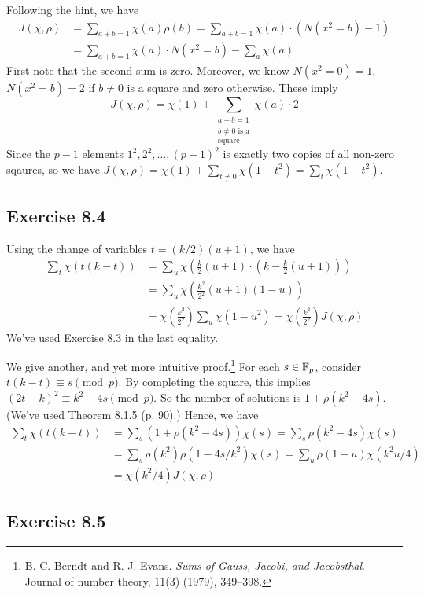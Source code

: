 \documentclass[../I&R.tex]{subfiles}
\begin{document}
Following the hint, we have
\begin{align*}
    J(\chi,\rho) &= \sum_{a+b=1} \chi(a)\rho(b)=\sum_{a+b=1} \chi(a)\cdot\left(N(x^2=b)-1\right) \\
    &= \sum_{a+b=1} \chi(a)\cdot N(x^2=b)-\sum_a \chi(a)
\end{align*}
First note that the second sum is zero. Moreover, we know $N(x^2=0)=1$, $N(x^2=b)=2$ if $b\neq0$ is a square and zero otherwise. These imply $$J(\chi,\rho) = \chi(1) + \sum_{\substack{a+b=1\\ b\neq0 \text{ is a} \\ \text{square}}} \chi(a)\cdot 2$$
Since the $p-1$ elements $1^2,2^2,\ldots,(p-1)^2$ is exactly two copies of all non-zero sqaures, so we have $J(\chi,\rho) = \chi(1) + \sum_{t\neq0} \chi(1-t^2) = \sum_t \chi(1-t^2)$.

\subsection*{Exercise 8.4}

Using the change of variables $t=(k/2)(u+1)$, we have
\begin{align*}
    \sum_t \chi(t(k-t)) &= \sum_u \chi\left(\frac{k}{2}(u+1)\cdot\left(k-\frac{k}{2}(u+1)\right)\right) \\
    &= \sum_u \chi\left(\frac{k^2}{2^2}(u+1)(1-u)\right) \\ 
    &= \chi\left(\frac{k^2}{2^2}\right)\sum_u \chi(1-u^2) = \chi\left(\frac{k^2}{2^2}\right) J(\chi,\rho)
\end{align*}
We've used Exercise 8.3 in the last equality.

We give another, and yet more intuitive proof.\footnote{B. C. Berndt and R. J. Evans. \textit{Sums of Gauss, Jacobi, and Jacobsthal}. Journal of number theory, 11(3) (1979), 349–398.} For each $s\in\mathbb{F}_p$, consider $t(k-t)\equiv s\pmod{p}$. By completing the square, this implies $(2t-k)^2\equiv k^2-4s\pmod{p}$. So the number of solutions is $1+\rho(k^2-4s)$. (We've used Theorem 8.1.5 (p. 90).) Hence, we have
\begin{align*}
    \sum_t \chi(t(k-t)) &= \sum_s \left(1+\rho(k^2-4s)\right)\chi(s) = \sum_s \rho(k^2-4s)\chi(s) \\
    &= \sum_s \rho(k^2)\rho(1-4s/k^2)\chi(s) = \sum_u \rho(1-u)\chi(k^2u/4) \\
    &= \chi(k^2/4)J(\chi,\rho)
\end{align*} 

\subsection*{Exercise 8.5}
\end{document}
